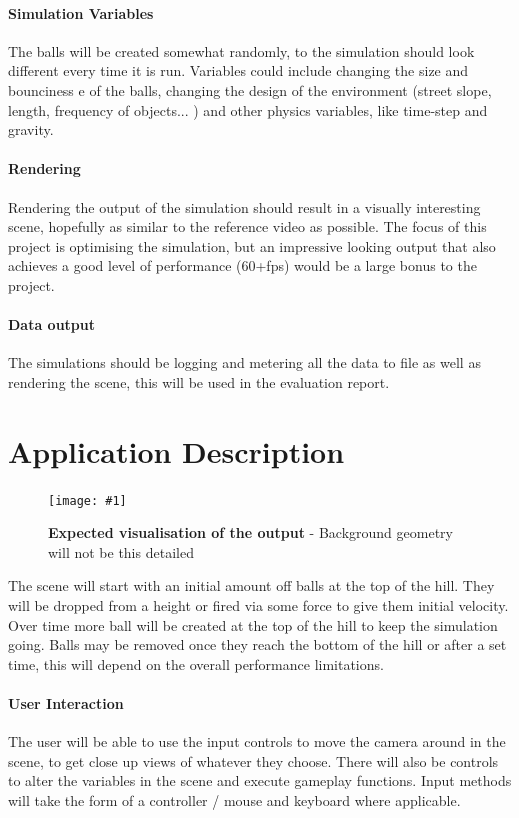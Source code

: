 \documentclass[conference]{acmsiggraph}
\newcommand{\figuremacroW}[4]{
	\begin{figure}[h] %
		\centering
		\texttt{[image: \#1]}
		\caption[#2]{\textbf{#2} - #3}
		\label{fig:#1}
	\end{figure}
}
\begin{document}
\paragraph{Simulation Variables}
The balls will be created somewhat randomly, to the simulation should look different every time it is run. Variables could include changing the size and bounciness e of the balls, changing the design of the environment (street slope, length, frequency of objects... ) and other physics variables, like time-step and gravity.

\paragraph{Rendering}
Rendering the output of the simulation should result in a visually interesting scene, hopefully as similar to the reference video as possible. The focus of this project is optimising the simulation, but an impressive looking output that also achieves a good level of performance (60+fps) would be a large bonus to the project.

\paragraph{Data output}
The simulations should be logging and metering all the data to file as well as rendering the scene, this will be used in the evaluation report.

\section{Application Description}

\figuremacroW
{balls2}
{Expected visualisation of the output}
{Background geometry will not be this detailed \protect\cite{advert}}
{0.96}

The scene will start with an initial amount off balls at the top of the hill. They will be dropped from a height or fired via some force to give them initial velocity. Over time more ball will be created at the top of the hill to keep the simulation going. Balls may be removed once they reach the bottom of the hill or after a set time, this will depend on the overall performance limitations.

\paragraph{User Interaction}
The user will be able to use the input controls to move the camera around in the scene, to get close up views of whatever they choose. There will also be controls to alter the variables in the scene and execute gameplay functions. Input methods will take the form of a controller / mouse and keyboard where applicable.
\end{document}
